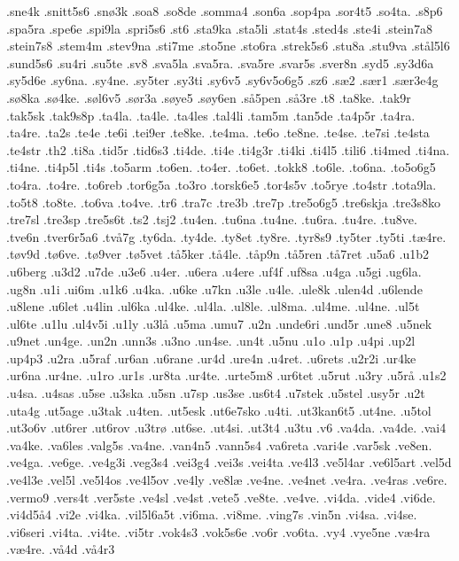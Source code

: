 {.sne4k
.snitt5s6
.snø3k
.soa8
.so8de
.somma4
.son6a
.sop4pa
.sor4t5
.so4ta.
.s8p6
.spa5ra
.spe6e
.spi9la
.spri5s6
.st6
.sta9ka
.sta5li
.stat4s
.sted4s
.ste4i
.stein7a8
.stein7s8
.stem4m
.stev9na
.sti7me
.sto5ne
.sto6ra
.strek5s6
.stu8a
.stu9va
.stål5l6
.sund5s6
.su4ri
.su5te
.sv8
.sva5la
.sva5ra.
.sva5re
.svar5s
.sver8n
.syd5
.sy3d6a
.sy5d6e
.sy6na.
.sy4ne.
.sy5ter
.sy3ti
.sy6v5
.sy6v5o6g5
.sz6
.sæ2
.sær1
.sær3e4g
.sø8ka
.sø4ke.
.søl6v5
.sør3a
.søye5
.søy6en
.så5pen
.så3re
.t8
.ta8ke.
.tak9r
.tak5sk
.tak9s8p
.ta4la.
.ta4le.
.ta4les
.tal4li
.tam5m
.tan5de
.ta4p5r
.ta4ra.
.ta4re.
.ta2s
.te4e
.te6i
.tei9er
.te8ke.
.te4ma.
.te6o
.te8ne.
.te4se.
.te7si
.te4sta
.te4str
.th2
.ti8a
.tid5r
.tid6s3
.ti4de.
.ti4e
.ti4g3r
.ti4ki
.ti4l5
.tili6
.ti4med
.ti4na.
.ti4ne.
.ti4p5l
.ti4s
.to5arm
.to6en.
.to4er.
.to6et.
.tokk8
.to6le.
.to6na.
.to5o6g5
.to4ra.
.to4re.
.to6reb
.tor6g5a
.to3ro
.torsk6e5
.tor4s5v
.to5rye
.to4str
.tota9la.
.to5t8
.to8te.
.to6va
.to4ve.
.tr6
.tra7c
.tre3b
.tre7p
.tre5o6g5
.tre6skja
.tre3s8ko
.tre7sl
.tre3sp
.tre5s6t
.ts2
.tsj2
.tu4en.
.tu6na
.tu4ne.
.tu6ra.
.tu4re.
.tu8ve.
.tve6n
.tver6r5a6
.två7g
.ty6da.
.ty4de.
.ty8et
.ty8re.
.tyr8s9
.ty5ter
.ty5ti
.tæ4re.
.tøv9d
.tø6ve.
.tø9ver
.tø5vet
.tå5ker
.tå4le.
.tåp9n
.tå5ren
.tå7ret
.u5a6
.u1b2
.u6berg
.u3d2
.u7de
.u3e6
.u4er.
.u6era
.u4ere
.uf4f
.uf8sa
.u4ga
.u5gi
.ug6la.
.ug8n
.u1i
.ui6m
.u1k6
.u4ka.
.u6ke
.u7kn
.u3le
.u4le.
.ule8k
.ulen4d
.u6lende
.u8lene
.u6let
.u4lin
.ul6ka
.ul4ke.
.ul4la.
.ul8le.
.ul8ma.
.ul4me.
.ul4ne.
.ul5t
.ul6te
.u1lu
.ul4v5i
.u1ly
.u3lå
.u5ma
.umu7
.u2n
.unde6ri
.und5r
.une8
.u5nek
.u9net
.un4ge.
.un2n
.unn3s
.u3no
.un4se.
.un4t
.u5nu
.u1o
.u1p
.u4pi
.up2l
.up4p3
.u2ra
.u5raf
.ur6an
.u6rane
.ur4d
.ure4n
.u4ret.
.u6rets
.u2r2i
.ur4ke
.ur6na
.ur4ne.
.u1ro
.ur1s
.ur8ta
.ur4te.
.urte5m8
.ur6tet
.u5rut
.u3ry
.u5rå
.u1s2
.u4sa.
.u4sas
.u5se
.u3ska
.u5sn
.u7sp
.us3se
.us6t4
.u7stek
.u5stel
.usy5r
.u2t
.uta4g
.ut5age
.u3tak
.u4ten.
.ut5esk
.ut6e7sko
.u4ti.
.ut3kan6t5
.ut4ne.
.u5tol
.ut3o6v
.ut6rer
.ut6rov
.u3trø
.ut6se.
.ut4si.
.ut3t4
.u3tu
.v6
.va4da.
.va4de.
.vai4
.va4ke.
.va6les
.valg5s
.va4ne.
.van4n5
.vann5s4
.va6reta
.vari4e
.var5sk
.ve8en.
.ve4ga.
.ve6ge.
.ve4g3i
.veg3s4
.vei3g4
.vei3s
.vei4ta
.ve4l3
.ve5l4ar
.ve6l5art
.vel5d
.ve4l3e
.vel5l
.ve5l4os
.ve4l5ov
.ve4ly
.ve8læ
.ve4ne.
.ve4net
.ve4ra.
.ve4ras
.ve6re.
.vermo9
.vers4t
.ver5ste
.ve4sl
.ve4st
.vete5
.ve8te.
.ve4ve.
.vi4da.
.vide4
.vi6de.
.vi4d5å4
.vi2e
.vi4ka.
.vil5l6a5t
.vi6ma.
.vi8me.
.ving7s
.vin5n
.vi4sa.
.vi4se.
.vi6seri
.vi4ta.
.vi4te.
.vi5tr
.vok4s3
.vok5s6e
.vo6r
.vo6ta.
.vy4
.vye5ne
.væ4ra
.væ4re.
.vå4d
.vå4r3
}

